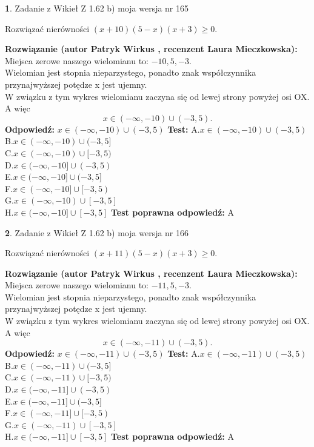 \documentclass[12pt, a4paper]{article}
\theoremstyle{definition} %
\newtheorem{zad}{}
\newcommand{\zadStart}[1]{\begin{zad}#1\newline}
\newcommand{\zadStop}{\end{zad}}
\newcommand{\rozwStart}[2]{\noindent \textbf{Rozwiązanie (autor #1 , recenzent #2): }\newline}
\newcommand{\rozwStop}{\newline}
\newcommand{\odpStart}{\noindent \textbf{Odpowiedź:}\newline}
\newcommand{\odpStop}{\newline}
\newcommand{\testStart}{\noindent \textbf{Test:}\newline}
\newcommand{\testStop}{\newline}
\newcommand{\kluczStart}{\noindent \textbf{Test poprawna odpowiedź:}\newline}
\newcommand{\kluczStop}{\newline}
\begin{document}
\zadStart{Zadanie z Wikieł Z 1.62 b) moja wersja nr 165}

Rozwiązać nierówności $(x+10)(5-x)(x+3)\ge0$.
\zadStop
\rozwStart{Patryk Wirkus}{Laura Mieczkowska}
Miejsca zerowe naszego wielomianu to: $-10, 5, -3$.\\
Wielomian jest stopnia nieparzystego, ponadto znak współczynnika przy\linebreak najwyższej potędze x jest ujemny.\\ W związku z tym wykres wielomianu zaczyna się od lewej strony powyżej osi OX. A więc $$x \in (-\infty,-10) \cup (-3,5).$$
\rozwStop
\odpStart
$x \in (-\infty,-10) \cup (-3,5)$
\odpStop
\testStart
A.$x \in (-\infty,-10) \cup (-3,5)$\\
B.$x \in (-\infty,-10) \cup (-3,5]$\\
C.$x \in (-\infty,-10) \cup [-3,5)$\\
D.$x \in (-\infty,-10] \cup (-3,5)$\\
E.$x \in (-\infty,-10] \cup (-3,5]$\\
F.$x \in (-\infty,-10] \cup [-3,5)$\\
G.$x \in (-\infty,-10) \cup [-3,5]$\\
H.$x \in (-\infty,-10] \cup [-3,5]$
\testStop
\kluczStart
A
\kluczStop



\zadStart{Zadanie z Wikieł Z 1.62 b) moja wersja nr 166}

Rozwiązać nierówności $(x+11)(5-x)(x+3)\ge0$.
\zadStop
\rozwStart{Patryk Wirkus}{Laura Mieczkowska}
Miejsca zerowe naszego wielomianu to: $-11, 5, -3$.\\
Wielomian jest stopnia nieparzystego, ponadto znak współczynnika przy\linebreak najwyższej potędze x jest ujemny.\\ W związku z tym wykres wielomianu zaczyna się od lewej strony powyżej osi OX. A więc $$x \in (-\infty,-11) \cup (-3,5).$$
\rozwStop
\odpStart
$x \in (-\infty,-11) \cup (-3,5)$
\odpStop
\testStart
A.$x \in (-\infty,-11) \cup (-3,5)$\\
B.$x \in (-\infty,-11) \cup (-3,5]$\\
C.$x \in (-\infty,-11) \cup [-3,5)$\\
D.$x \in (-\infty,-11] \cup (-3,5)$\\
E.$x \in (-\infty,-11] \cup (-3,5]$\\
F.$x \in (-\infty,-11] \cup [-3,5)$\\
G.$x \in (-\infty,-11) \cup [-3,5]$\\
H.$x \in (-\infty,-11] \cup [-3,5]$
\testStop
\kluczStart
A
\kluczStop
\end{document}
